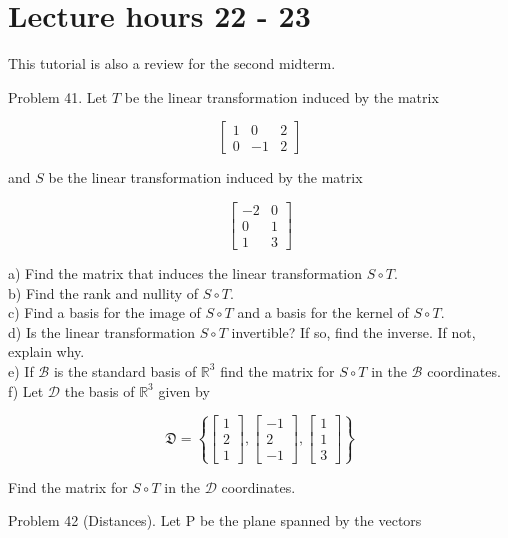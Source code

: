 \documentclass[10pt]{article}
\begin{document}
\section*{Lecture hours 22 - 23}
This tutorial is also a review for the second midterm.

Problem 41. Let $T$ be the linear transformation induced by the matrix

$$
\left[\begin{array}{ccc}
1 & 0 & 2 \\
0 & -1 & 2
\end{array}\right]
$$

and $S$ be the linear transformation induced by the matrix

$$
\left[\begin{array}{cc}
-2 & 0 \\
0 & 1 \\
1 & 3
\end{array}\right]
$$

a) Find the matrix that induces the linear transformation $S \circ T$.\\
b) Find the rank and nullity of $S \circ T$.\\
c) Find a basis for the image of $S \circ T$ and a basis for the kernel of $S \circ T$.\\
d) Is the linear transformation $S \circ T$ invertible? If so, find the inverse. If not, explain why.\\
e) If $\mathcal{B}$ is the standard basis of $\mathbb{R}^{3}$ find the matrix for $S \circ T$ in the $\mathcal{B}$ coordinates.\\
f) Let $\mathcal{D}$ the basis of $\mathbb{R}^{3}$ given by

$$
\mathfrak{D}=\left\{\left[\begin{array}{l}
1 \\
2 \\
1
\end{array}\right],\left[\begin{array}{c}
-1 \\
2 \\
-1
\end{array}\right],\left[\begin{array}{l}
1 \\
1 \\
3
\end{array}\right]\right\}
$$

Find the matrix for $S \circ T$ in the $\mathcal{D}$ coordinates.

Problem 42 (Distances). Let P be the plane spanned by the vectors
\end{document}

